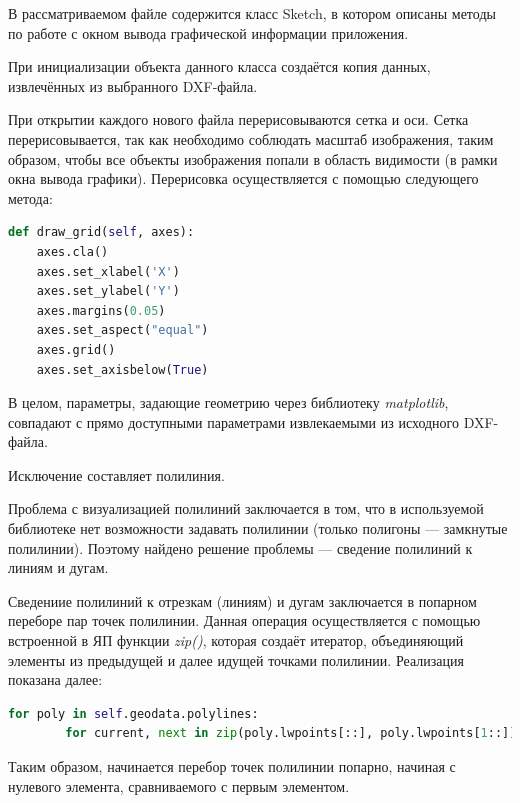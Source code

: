 В рассматриваемом файле содержится класс Sketch, в котором описаны методы по работе с окном вывода графической информации приложения.

При инициализации объекта данного класса создаётся копия данных, извлечённых из выбранного DXF-файла.

При открытии каждого нового файла перерисовываются сетка и оси. Сетка перерисовывается, так как необходимо соблюдать масштаб изображения, таким образом, чтобы все объекты изображения попали в область видимости (в рамки окна вывода графики). Перерисовка осуществляется с помощью следующего метода:
\begin{lstlisting}[language=python,label=list:redraw]
def draw_grid(self, axes):
	axes.cla()
	axes.set_xlabel('X')
	axes.set_ylabel('Y')
	axes.margins(0.05)
	axes.set_aspect("equal")
	axes.grid()
	axes.set_axisbelow(True)
\end{lstlisting}

В целом, параметры, задающие геометрию через библиотеку \textit{matplotlib}, совпадают с прямо доступными параметрами извлекаемыми из исходного DXF-файла.

Исключение составляет полилиния.

Проблема с визуализацией полилиний заключается в том, что в используемой библиотеке нет возможности задавать полилинии (только полигоны --- замкнутые полилинии). Поэтому найдено решение проблемы --- сведение полилиний к линиям и дугам.

Сведениие полилиний к отрезкам (линиям) и дугам заключается в попарном переборе пар точек полилинии. Данная операция осуществляется с помощью встроенной в ЯП функции \textit{zip()}, которая создаёт итератор, объединяющий элементы из предыдущей и далее идущей точками полилинии. Реализация показана далее:
\begin{lstlisting}[language=python,label=list:redraw]
	for poly in self.geodata.polylines:
		for current, next in zip(poly.lwpoints[::], poly.lwpoints[1::]):
\end{lstlisting}

Таким образом, начинается перебор точек полилинии попарно, начиная с нулевого элемента, сравниваемого с первым элементом.

